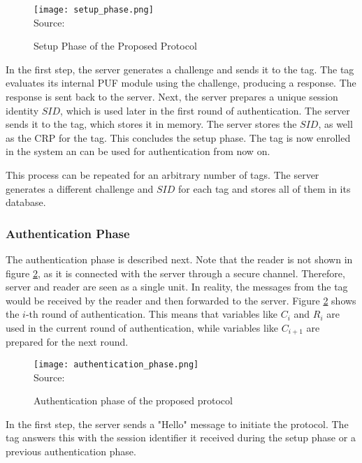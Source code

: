 \begin{figure}[H]
    \centering
    \caption{Setup Phase of the Proposed Protocol}
    \label{fig:protocol_setup}
    \texttt{[image: setup\_phase.png]}
    \\
    Source: \cite[][p. 6]{Zhu2019}
\end{figure}

In the first step, the server generates a challenge and sends it to the tag.
The tag evaluates its internal PUF module using the challenge, producing a response.
The response is sent back to the server.
Next, the server prepares a unique session identity $SID$, which is used later in the first round of
authentication. The server sends it to the tag, which stores it in memory.
The server stores the $SID$, as well as the \ac{CRP} for the tag.
This concludes the setup phase. The tag is now enrolled in the system an can be used for authentication
from now on. \cite[][p. 7]{Zhu2019}

This process can be repeated for an arbitrary number of tags. The server generates a different challenge
and $SID$ for each tag and stores all of them in its database. \cite[][p. 7]{Zhu2019}

\subsubsection{Authentication Phase}

The authentication phase is described next.
Note that the reader is not shown in figure \ref{fig:protocol_authentication}, as it is connected with the server through a
secure channel. Therefore, server and reader are seen as a single unit. In reality, the messages from
the tag would be received by the reader and then forwarded to the server.
Figure \ref{fig:protocol_authentication} shows the $i$-th round of authentication.
This means that variables like $C_i$ and $R_i$ are used in the current round of authentication,
while variables like $C_{i+1}$ are prepared for the next round.

\begin{figure}[H]
    \centering
    \caption{Authentication phase of the proposed protocol}
    \label{fig:protocol_authentication}
    \texttt{[image: authentication\_phase.png]}
    \\
    Source: \cite[][p. 7]{Zhu2019}
\end{figure}

In the first step, the server sends a "Hello" message to initiate the protocol. The tag answers this
with the session identifier it received during the setup phase or a previous authentication phase. \cite[][p. 7]{Zhu2019}

